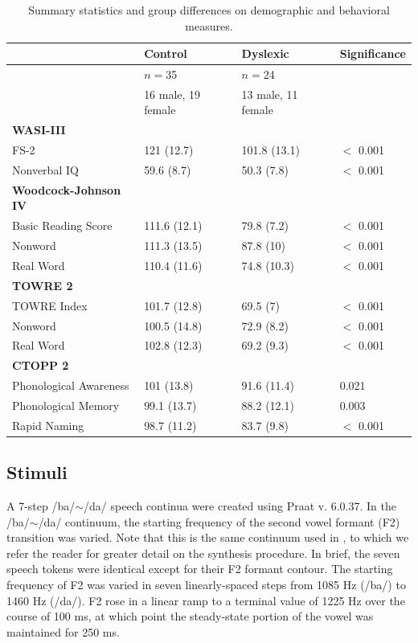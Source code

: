 \documentclass[../uwthesis.tex]{subfiles}
\begin{document}
\begin{table}
  \begin{threeparttable}
    \caption{Summary statistics and group differences on demographic and behavioral measures.}
    \label{tab:group_demo}
    \begin{tabular}{llll}
    \toprule
      & Control & Dyslexic & Significance\\
    \midrule
     & $n=$35 & $n=$24 & \\
     & 16 male, 19 female & 13 male, 11 female & \\
    \textbf{WASI-III} &  &  & \\
    FS-2 & 121 (12.7) & 101.8 (13.1) & $<$ 0.001\\
    Nonverbal IQ & 59.6 (8.7) & 50.3 (7.8) & $<$ 0.001\\
    \textbf{Woodcock-Johnson IV} &  &  & \\
    Basic Reading Score & 111.6 (12.1) & 79.8 (7.2) & $<$ 0.001\\
    Nonword & 111.3 (13.5) & 87.8 (10) & $<$ 0.001\\
    Real Word & 110.4 (11.6) & 74.8 (10.3) & $<$ 0.001\\
    \textbf{TOWRE 2} &  &  & \\
    TOWRE Index & 101.7 (12.8) & 69.5 (7) & $<$ 0.001\\
    Nonword & 100.5 (14.8) & 72.9 (8.2) & $<$ 0.001\\
    Real Word & 102.8 (12.3) & 69.2 (9.3) & $<$ 0.001\\
    \textbf{CTOPP 2} &  &  & \\
    Phonological Awareness & 101 (13.8) & 91.6 (11.4) & 0.021\\
    Phonological Memory & 99.1 (13.7) & 88.2 (12.1) & 0.003\\
    Rapid Naming & 98.7 (11.2) & 83.7 (9.8) & $<$ 0.001\\
    \bottomrule
\end{tabular}
    \end{threeparttable}
\end{table}


\subsection{Stimuli}
A 7-step /ba/$\sim$/da/ speech continua were created using Praat v. 6.0.37. In the /ba/$\sim$/da/ continuum, the starting frequency of the second vowel formant (F2) transition was varied. Note that this is the same continuum used in \citep{OBrien2019CategoricalDuration}, to which we refer the reader for greater detail on the synthesis procedure. In brief, the seven speech tokens were identical except for their F2 formant contour. The starting frequency of F2 was varied in seven linearly-spaced steps from 1085 Hz (/ba/) to 1460 Hz (/da/). F2 rose in a linear ramp to a terminal value of 1225 Hz over the course of 100 ms, at which point the steady-state portion of the vowel was maintained for 250 ms. 
\end{document}

